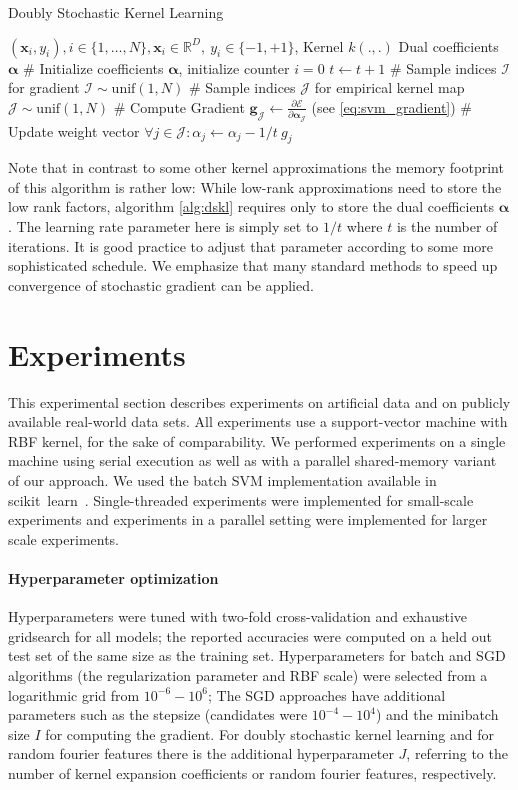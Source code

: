 \documentclass{article} %
\newcommand{\R}{\ensuremath{\mathds{R}}}
\newcommand{\va}{\boldsymbol{\alpha}}
\newcommand{\Bx}{\mathbf{x}}
\renewcommand{\vec}[1]{\mathbf{#1}}
\begin{document}
% 
\begin{algorithm}
  \begin{algorithmic}
    \caption{Doubly Stochastic Kernel Learning\label{alg:dskl}}
     \REQUIRE $(\Bx_i,y_i),i\in\{1,\dots,N\},\Bx_i\in\R^{D},~y_i\in\{-1,+1\}$, Kernel $k(.,.)$
    \ENSURE Dual coefficients $\va$ 
   \STATE \# Initialize coefficients $\va$, initialize counter $i=0$
   \STATE $t\gets t+1$
   \STATE \# Sample indices $\mathcal{I}$ for gradient 
   \STATE $\mathcal{I}\sim\text{unif}(1,N)$
   \STATE \# Sample indices $\mathcal{J}$ for empirical kernel map
   \STATE $\mathcal{J}\sim\text{unif}(1,N)$
   \STATE \# Compute Gradient
   \STATE $\vec{g}_{\mathcal{J}} \gets \frac{\partial \mathcal{E}}{\partial\va_{\mathcal{J}}}$ (see \autoref{eq:svm_gradient})
   \STATE \# Update weight vector 
   \STATE $\forall j\in\mathcal{J}: \alpha_j\gets\alpha_j - 1/t~ g_j$ 
   \ENDWHILE
  \end{algorithmic}
\end{algorithm}
%
Note that in contrast to some other kernel approximations the memory footprint of this algorithm is rather low: While low-rank approximations need to store the low rank factors, algorithm \autoref{alg:dskl} requires only to store the dual coefficients $\va$. 
The learning rate parameter here is simply set to $1/t$ where $t$ is the number of iterations. It is good practice to adjust that parameter according to some more sophisticated schedule. We emphasize that many standard methods to speed up convergence of stochastic gradient can be applied.
%
\section{Experiments}\label{sec:experiments}
This experimental section describes experiments on artificial data and on publicly available real-world data sets. All experiments use a support-vector machine with RBF kernel, for the sake of comparability. We performed experiments on a single machine using serial execution as well as with a parallel shared-memory variant of our approach. We used the batch SVM implementation available in scikit~learn~\cite{sklearn_api}. Single-threaded experiments were implemented for small-scale experiments and experiments in a parallel setting were implemented for larger scale experiments. 

\paragraph{Hyperparameter optimization} Hyperparameters were tuned with two-fold cross-validation and exhaustive gridsearch for all models; the reported accuracies were computed on a held out test set of the same size as the training set. Hyperparameters for batch and SGD algorithms (the regularization parameter and RBF scale) were selected from a logarithmic grid from $10^{-6}-10^6$; The SGD approaches have additional parameters such as the stepsize (candidates were $10^{-4}-10^4$) and the minibatch size $I$ for computing the gradient. For doubly stochastic kernel learning and for random fourier features there is the additional hyperparameter $J$, referring to the number of kernel expansion coefficients or random fourier features, respectively.
\end{document}
